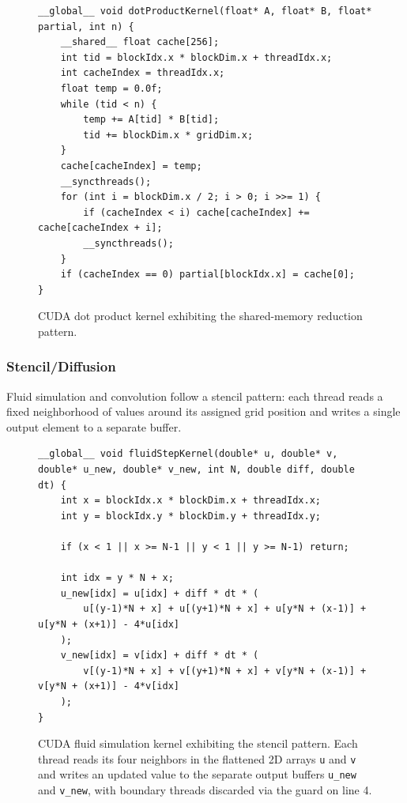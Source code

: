 \documentclass{article}
\begin{document}
\begin{figure}[H]
\begin{verbatim}
__global__ void dotProductKernel(float* A, float* B, float* partial, int n) {
    __shared__ float cache[256];
    int tid = blockIdx.x * blockDim.x + threadIdx.x;
    int cacheIndex = threadIdx.x;
    float temp = 0.0f;
    while (tid < n) {
        temp += A[tid] * B[tid];
        tid += blockDim.x * gridDim.x;
    }
    cache[cacheIndex] = temp;
    __syncthreads();
    for (int i = blockDim.x / 2; i > 0; i >>= 1) {
        if (cacheIndex < i) cache[cacheIndex] += cache[cacheIndex + i];
        __syncthreads();
    }
    if (cacheIndex == 0) partial[blockIdx.x] = cache[0];
}
\end{verbatim}
\caption{CUDA dot product kernel exhibiting the shared-memory reduction pattern.}
\label{fig:dotproduct-kernel}
\end{figure}

\subsubsection{Stencil/Diffusion}

Fluid simulation and convolution follow a stencil pattern: each thread reads a fixed neighborhood of values around its assigned grid position and writes a single output element to a separate buffer.

\begin{figure}[H]
\begin{verbatim}
__global__ void fluidStepKernel(double* u, double* v, double* u_new, double* v_new, int N, double diff, double dt) {
    int x = blockIdx.x * blockDim.x + threadIdx.x;
    int y = blockIdx.y * blockDim.y + threadIdx.y;

    if (x < 1 || x >= N-1 || y < 1 || y >= N-1) return;

    int idx = y * N + x;
    u_new[idx] = u[idx] + diff * dt * (
        u[(y-1)*N + x] + u[(y+1)*N + x] + u[y*N + (x-1)] + u[y*N + (x+1)] - 4*u[idx]
    );
    v_new[idx] = v[idx] + diff * dt * (
        v[(y-1)*N + x] + v[(y+1)*N + x] + v[y*N + (x-1)] + v[y*N + (x+1)] - 4*v[idx]
    );
}
\end{verbatim}
\caption{CUDA fluid simulation kernel exhibiting the stencil pattern. Each thread reads its four neighbors in the flattened 2D arrays \texttt{u} and \texttt{v} and writes an updated value to the separate output buffers \texttt{u\_new} and \texttt{v\_new}, with boundary threads discarded via the guard on line 4.}
\label{fig:fluid-kernel}
\end{figure}
\end{document}
